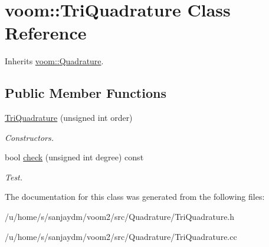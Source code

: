 \hypertarget{classvoom_1_1_tri_quadrature}{
\section{voom::TriQuadrature Class Reference}
\label{classvoom_1_1_tri_quadrature}
}


Inherits \hyperlink{classvoom_1_1_quadrature}{voom::Quadrature}.\subsection*{Public Member Functions}
\begin{DoxyCompactItemize}
\item 
\hypertarget{classvoom_1_1_tri_quadrature_a28624f45052474c3577c4cad71b053a2}{
\hyperlink{classvoom_1_1_tri_quadrature_a28624f45052474c3577c4cad71b053a2}{TriQuadrature} (unsigned int order)}
\label{classvoom_1_1_tri_quadrature_a28624f45052474c3577c4cad71b053a2}

\begin{DoxyCompactList}\small\item\em Constructors. \item\end{DoxyCompactList}\item 
\hypertarget{classvoom_1_1_tri_quadrature_ab3de8be8921558eed98c4c9814fea985}{
bool \hyperlink{classvoom_1_1_tri_quadrature_ab3de8be8921558eed98c4c9814fea985}{check} (unsigned int degree) const }
\label{classvoom_1_1_tri_quadrature_ab3de8be8921558eed98c4c9814fea985}

\begin{DoxyCompactList}\small\item\em Test. \item\end{DoxyCompactList}\end{DoxyCompactItemize}


The documentation for this class was generated from the following files:\begin{DoxyCompactItemize}
\item 
/u/home/s/sanjaydm/voom2/src/Quadrature/TriQuadrature.h\item 
/u/home/s/sanjaydm/voom2/src/Quadrature/TriQuadrature.cc\end{DoxyCompactItemize}
